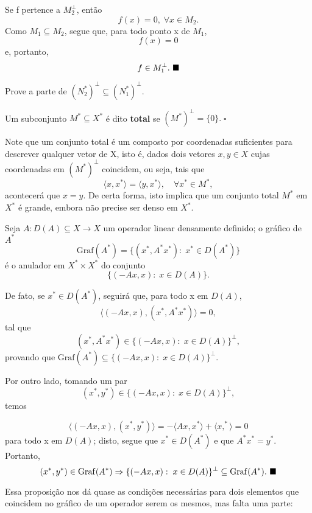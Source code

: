 \documentclass[../functional_analysis.tex]{subfiles}
\begin{document}
\begin{proof*}
	Se f pertence a \(M_{2}^{\perp }\), então
	\[
		f(x) = 0,\; \forall x\in M_2.
	\]
	Como \(M_1 \subseteq M_2\), segue que, para todo ponto x de \(M_1\),
	\[
		f(x) = 0
	\]
	e, portanto,
	\[
		f\in M_{1}^{\perp }. \text{ $\blacksquare$}
	\]
\end{proof*}
\begin{exr}
	Prove a parte de \((N_{2}^{*})^{\perp } \subseteq (N_{1}^{*})^{\perp }\).
\end{exr}
\begin{def*}
	Um subconjunto \(M^{*}\subseteq X^{*}\) é dito \textbf{total} se \((M^{*})^{\perp }=\{0\}.\; \square\)
\end{def*}
Note que um conjunto total é um composto por coordenadas suficientes para descrever qualquer vetor de X, isto é, dados dois vetores
\(x, y\in X\) cujas coordenadas em \((M^{*})^{\perp }\) coincidem, ou seja, tais que
\[
	\langle x, x^{*} \rangle=\langle y, x^{*} \rangle,\quad \forall x^{*}\in M^{*},
\]
acontecerá que \(x=y\). De certa forma, isto implica que um conjunto total \(M^{*}\) em \(X^{*}\) é grande, embora não precise ser denso em \(X^{*}\).
\begin{prop*}
	Seja \(A:D(A)\subseteq X\rightarrow X\) um operador linear densamente definido; o gráfico de \(A^{*}\)
	\[
		\mathrm{Graf}(A^{*})=\{(x^{*}, A^{*}x^{*}):\; x^{*}\in D(A^{*})\}
	\]
	é o anulador em \(X^{*}\times X^{*}\) do conjunto
	\[
		\{(-Ax, x):\; x\in D(A)\}.
	\]
\end{prop*}
\begin{proof*}
	De fato, se \(x^{*}\in D(A^{*})\), seguirá que, para todo x em \(D(A)\),
	\[
		\langle (-Ax, x), (x^{*}, A^{*}x^{*}) \rangle = 0,
	\]
	tal que
	\[
		(x^{*}, A^{*}x^{*})\in \{(-Ax, x):\; x\in D(A)\}^{\perp },
	\]
	provando que \(\mathrm{Graf}(A^{*})\subseteq \{(-Ax, x):\; x\in D(A)\}^{\perp }\).

	Por outro lado, tomando um par
	\[
		(x^{*}, y^{*})\in \{(-Ax, x):\; x\in D(A)\}^{\perp },
	\]
	temos

	\[
		\langle (-Ax, x), (x^{*}, y^{*}) \rangle=-\langle Ax, x^{*} \rangle + \langle x, ^{*} \rangle =0
	\]
	para todo x em \(D(A)\); disto, segue que \(x^{*}\in D(A^{*})\) e que \(A^{*}x^{*}=y^{*}\). Portanto,
	\[
		(x^{*}, y^{*})\in \mathrm{Graf}(A^{*}) \Rightarrow \{(-Ax, x):\; x\in D(A)\}^{\perp }\subseteq \mathrm{Graf}(A^{*}).\text{ $\blacksquare$}
	\]
\end{proof*}
Essa proposição nos dá quase as condições necessárias para dois elementos que coincidem no gráfico de um operador serem os mesmos, mas falta uma parte:
\end{document}
